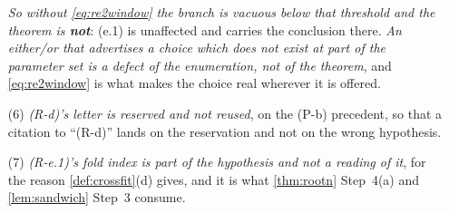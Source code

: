 \begin{remark}
\begin{enumerate}
\emph{So without \eqref{eq:re2window} the branch is vacuous below that threshold and the theorem is
\textbf{not}}: (e.1) is unaffected and carries the conclusion there. \emph{An either/or that advertises a
choice which does not exist at part of the parameter set is a defect of the enumeration, not of the
theorem}, and \eqref{eq:re2window} is what makes the choice real wherever it is offered.
\item[(6)] \emph{\textup{(R-d)}'s letter is \emph{reserved and not reused}}, on the \textup{(P-b)}
precedent, so that a citation to ``(R-d)'' lands on the reservation and not on the wrong hypothesis.
\item[(7)] \emph{\textup{(R-e.1)}'s fold index is part of the hypothesis and not a reading of it}, for
the reason \cref{def:crossfit}(d) gives, and it is what \cref{thm:rootn} Step~4(a) and
\cref{lem:sandwich} Step~3 consume.
\end{enumerate}
\end{remark}

